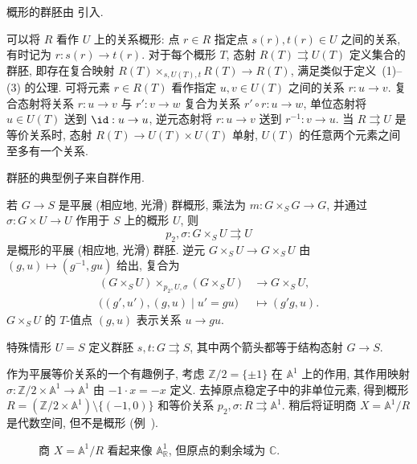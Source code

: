 概形的群胚由 \cite[Exp. V]{SGA3I} 引入.
\begin{remark}[关系]\label{src:4.4.2}
可以将 $R$ 看作 $U$ 上的关系概形: 点 $r\in R$ 指定点 $s(r),t(r)\in U$ 之间的关系, 有时记为 $r:s(r)\to t(r)$. 对于每个概形 $T$, 态射 $R(T)\rightrightarrows U(T)$ 定义集合的群胚, 即存在复合映射 $R(T)\times_{s,U(T),t}R(T)\to R(T)$, 满足类似于定义~(1)--(3) 的公理. 可将元素 $r\in R(T)$ 看作指定 $u,v\in U(T)$ 之间的关系 $r:u\to v$. 复合态射将关系 $r:u\to v$ 与 $r':v\to w$ 复合为关系 $r'\circ r:u\to w$, 单位态射将 $u\in U(T)$ 送到 $\id:u\to u$, 逆元态射将 $r:u\to v$ 送到 $r^{-1}:v\to u$. 当 $R\rightrightarrows U$ 是等价关系时, 态射 $R(T)\to U(T)\times U(T)$ 单射, $U(T)$ 的任意两个元素之间至多有一个关系.
\end{remark}
群胚的典型例子来自群作用.
\begin{example}[群作用]\label{src:4.4.3}
若 $G\to S$ 是平展 (相应地, 光滑) 群概形, 乘法为 $m:G\times_S G\to G$, 并通过 $\sigma:G\times U\to U$ 作用于 $S$ 上的概形 $U$, 则
\[
p_2,\sigma:G\times_S U\rightrightarrows U
\]
是概形的平展 (相应地, 光滑) 群胚. 逆元 $G\times_S U\to G\times_S U$ 由 $(g,u)\mapsto(g^{-1},gu)$ 给出, 复合为
\[
\begin{aligned}
(G\times_S U)\times_{p_2,U,\sigma}(G\times_S U)&\longrightarrow G\times_S U,\\
\bigl((g',u'),(g,u)\mid u'=gu\bigr)&\longmapsto(g'g,u).
\end{aligned}
\]
$G\times_S U$ 的 $T$-值点 $(g,u)$ 表示关系 $u\to gu$.

特殊情形 $U=S$ 定义群胚 $s,t:G\rightrightarrows S$, 其中两个箭头都等于结构态射 $G\to S$.
\end{example}
\begin{example}\label{src:4.4.4}
作为平展等价关系的一个有趣例子, 考虑 $\mathbb Z/2=\{\pm1\}$ 在 $\mathbb A^1$ 上的作用, 其作用映射 $\sigma:\mathbb Z/2\times\mathbb A^1\to\mathbb A^1$ 由 $-1\cdot x=-x$ 定义. 去掉原点稳定子中的非单位元素, 得到概形 $R=(\mathbb Z/2\times\mathbb A^1)\setminus\{(-1,0)\}$ 和等价关系 $p_2,\sigma:R\rightrightarrows\mathbb A^1$. 稍后将证明商 $X=\mathbb A^1/R$ 是代数空间, 但不是概形 (例~).
\end{example}
\addtocounter{theorem}{-1}
\begin{figure}[H]
\centering
\caption{商 $X=\mathbb A^1/R$ 看起来像 $\mathbb A^1_{\mathbb R}$, 但原点的剩余域为 $\mathbb C$.}\label{src:4.4.4-figure}
\end{figure}
